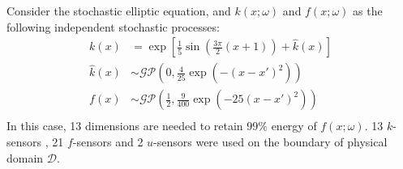 \documentclass[conference,compsoc]{IEEEtran}
\begin{document}
Consider the stochastic elliptic equation, and $k(x;\omega)$ and $f(x;\omega)$ as the following independent stochastic processes:
\begin{equation} \label{eqn:samples}
\begin{aligned}
	 k(x) & = \exp[\frac{1}{5}\sin(\frac{3\pi}{2}(x +1)) + \hat{k}(x)] \\
	\hat{k}(x) & \sim \mathcal{GP}\left(0, \frac{4}{25}\exp(-(x-x')^2)\right) \\
	f(x) & \sim \mathcal{GP}\left(\frac{1}{2}, \frac{9}{400}\exp(-25(x-x')^2)\right) \\
\end{aligned}
\end{equation}
In this case, 13 dimensions are needed to retain $99\%$ energy of $f(x;\omega)$. 13 $k$-sensors , 21 $f$-sensors and 2 $u$-sensors were used on the boundary of physical domain $\mathcal{D}$.
\end{document}
